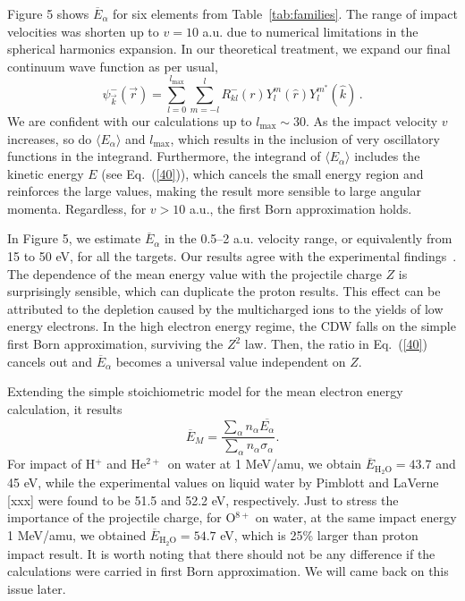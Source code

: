 \documentclass[preprint,12pt]{article}
\begin{document}
Figure 5 shows $\overline{E}_{\alpha}$ for six elements from 
Table~\ref{tab:families}. The range of impact velocities was shorten up 
to $v=10$ a.u. due to numerical limitations in the spherical harmonics 
expansion. In our theoretical treatment, we expand our final continuum 
wave function as per usual,
\begin{equation}
\psi_{\overrightarrow{k}}^{-}(\overrightarrow{r})=\sum_{l=0}^{l_{\max
}}\sum_{m=-l}^{l}R_{kl}^{-}(r)Y_{l}^{m}(\widehat{r})Y_{l}^{m^{\ast }}
(\widehat{k})\,.
\label{60}
\end{equation}
We are confident with our calculations up to $l_{\max}\sim 30$. 
As the impact velocity $v$ increases, so do $\langle E_{\alpha}\rangle$
and $l_{\max}$, which results in the inclusion of very oscillatory 
functions in the integrand. Furthermore, the integrand of
$\langle E_{\alpha}\rangle$ includes the kinetic energy $E$
(see Eq.~(\ref{40})), which cancels the small energy region and 
reinforces the large values, making the result more sensible to large
angular momenta. Regardless, for $v>10$ a.u., the first Born 
approximation holds.

In Figure 5, we estimate $\overline{E}_{\alpha}$ in the 0.5--2 a.u.
velocity range, or equivalently from 15 to 50 eV, for all the targets.
Our results agree with the experimental findings~\cite{surdutovic2018}. 
The dependence of the mean energy value with the projectile charge $Z$ 
is surprisingly sensible, which can duplicate the proton results. 
This effect can be attributed to the depletion caused by the 
multicharged ions to the yields of low energy electrons. In the high 
electron energy regime, the CDW falls on the simple first Born 
approximation, surviving the $Z^{2}$ law. Then, the ratio in 
Eq.~(\ref{40}) cancels out and $\overline{E}_{\alpha}$ becomes a 
universal value independent on $Z$.

Extending the simple stoichiometric model for the mean electron energy
calculation, it results
\begin{equation}
\overline{E}_{M}=\frac{\sum\limits_{\alpha}n_{\alpha}
\overline{E_{\alpha}}}{\sum\limits_{\alpha}n_{\alpha}\sigma_{\alpha}}.
\label{70}
\end{equation}
For impact of H$^{+}$ and He$^{2+~}$ on water at 1 MeV/amu, we obtain 
$\overline{E}_{\text{H}_{2}\text{O}}=43.7$ and 45 eV, while the 
experimental values 
on liquid water by Pimblott and LaVerne [xxx] were found to be 51.5 and 
52.2 eV, respectively. Just to stress the importance of the projectile 
charge, for O$^{8+}$ on water, at the same impact energy 1 MeV/amu, 
we obtained $\overline{E}_{\text{H}_{2}\text{O}}=54.7$ eV, which is 25\% 
larger than 
proton impact result. It is worth noting that there should not be any 
difference if the calculations were carried in first Born approximation. 
We will came back on this issue later.
\end{document}

